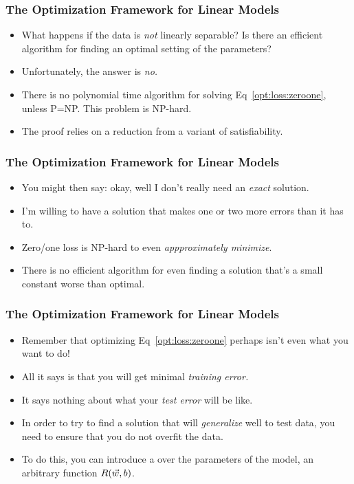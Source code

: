 \documentclass[trans,aspectratio=169]{beamer}
\begin{document}
\begin{frame}
  \frametitle{The Optimization Framework for Linear Models}
\begin{itemize}
\item 
What happens if the data is \emph{not} linearly
separable?  Is there an efficient algorithm for finding an optimal
setting of the parameters? 
\item Unfortunately, the answer is \emph{no.}
\item There is no polynomial time algorithm for solving
Eq~\eqref{opt:loss:zeroone}, unless P=NP.  This
problem is NP-hard.
\item  The proof  relies on a reduction from a
variant of satisfiability.
\end{itemize}
\end{frame}


\begin{frame}
  \frametitle{The Optimization Framework for Linear Models}
\begin{itemize}
\item 
You might then  say: okay, well I don't really need an
\emph{exact} solution.
\item   I'm willing to have a solution that makes one
or two more errors than it has to. 
\item  Zero/one loss is NP-hard to even \emph{appproximately
  minimize}.  
  \item There is no efficient algorithm for even
finding a solution that's a small constant worse than optimal.  
\end{itemize}
\end{frame}


\begin{frame}
  \frametitle{The Optimization Framework for Linear Models}
\begin{itemize}
\item 
Remember that optimizing
Eq~\eqref{opt:loss:zeroone} perhaps isn't even what you want to do!
\item All it says is that you will get minimal \emph{training
  error.}
\item   It says nothing about what your \emph{test error} will be
like.
\item  In order to try to find a solution that will \emph{generalize}
well to test data, you need to ensure that you do not overfit the
data.
\item  To do this, you can introduce a  over the
parameters of the model,  an arbitrary function
$R({\vec w},b)$.  
\end{itemize}
\end{frame}
\end{document}
